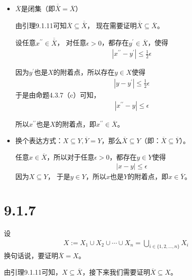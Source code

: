 \documentclass{article}
\begin{document}
\begin{itemize}
      \item $\overline{X}$是闭集（即$\overline{\overline{X}} = \overline{X}$）

            由引理9.1.11可知$\overline{X} \subseteq \overline{\overline{X}}$，
            现在需要证明$\overline{\overline{X}} \subseteq \overline{X}$。

            设任意$x^{\prime\prime} \in \overline{\overline{X}}$，
            对任意$\epsilon > 0$，都存在$y^\prime \in \overline{X}$，使得
            \begin{align*}
                  |x^{\prime\prime} - y^\prime| \leq \frac{1}{2} \epsilon
            \end{align*}

            因为$y^\prime$也是$X$的附着点，所以存在$y \in X$使得
            \begin{align*}
                  |y - y^\prime| \leq \frac{1}{2} \epsilon
            \end{align*}
            于是由命题4.3.7（c）可知，
            \begin{align*}
                  |x^{\prime\prime} - y| \leq \epsilon
            \end{align*}

            所以$x^{\prime\prime}$也是$X$的附着点，即$x^{\prime\prime} \in \overline{X}$。

      \item 换个表达方式：$X \subseteq Y, \overline{Y} = Y$，那么$\overline{X} \subseteq Y$（即：$\overline{X} \subseteq \overline{Y}$）。

            任意$x \in \overline{X}$，所以对于任意$\epsilon > 0$，都存在$y \in Y$使得
            \begin{align*}
                  |x - y| \leq \epsilon
            \end{align*}
            因为$X \subseteq Y$，
            于是$y \in Y$，所以$x$也是$Y$的附着点，即$x \in \overline{Y}$。
\end{itemize}

\section*{9.1.7}
设
\begin{align*}
      X := X_1 \cup X_2 \cup \cdots \cup X_n = \bigcup_{i \in \{1,2,...,n\}} X_i
\end{align*}
换句话说，要证明$\overline{X} = X$。

由引理9.1.11可知，$X \subseteq \overline{X}$，接下来我们需要证明$\overline{X} \subseteq X$。
\end{document}
